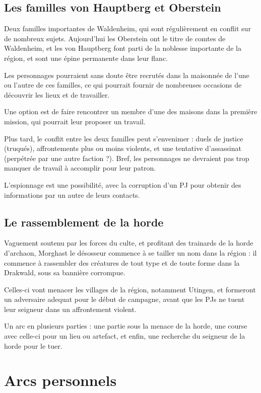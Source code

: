 \documentclass[10pt,a4paper]{book}
\begin{document}
\subsection{Les familles von Hauptberg et Oberstein}

Deux familles importantes de Waldenheim, qui sont régulièrement en conflit sur de nombreux sujets. Aujourd'hui les Oberstein ont le titre de comtes de Waldenheim, et les von Hauptberg font parti de la noblesse importante de la région, et sont une épine permanente dans leur flanc.

Les personnages pourraient sans doute être recrutés dans la maisonnée de l'une ou l'autre de ces familles, ce qui pourrait fournir de nombreuses occasions de découvrir les lieux et de travailler.

Une option est de faire rencontrer un membre d'une des maisons dans la première mission, qui pourrait leur proposer un travail.

Plus tard, le conflit entre les deux familles peut s'envenimer : duels de justice (truqués), affrontements plus ou moins violents, et une tentative d'assassinat (perpétrée par une autre faction ?). Bref, les personnages ne devraient pas trop manquer de travail à accomplir pour leur patron.

L'espionnage est une possibilité, avec la corruption d'un PJ pour obtenir des informations par un autre de leurs contacts.

\subsection{Le rassemblement de la horde}
Vaguement soutenu par les forces du culte, et profitant des trainards de la horde d'archaon, Morghast le désosseur commence à se tailler un nom dans la région : il commence à rassembler des créatures de tout type et de toute forme dans la Drakwald, sous sa bannière corrompue.

Celles-ci vont menacer les villages de la région, notamment Utingen, et formeront un adversaire adequat pour le début de campagne, avant que les PJs ne tuent leur seigneur dans un affrontement violent. 

Un arc en plusieurs parties : une partie sous la menace de la horde, une course avec celle-ci pour un lieu ou artefact, et enfin, une recherche du seigneur de la horde pour le tuer.
\section{Arcs personnels}
\end{document}
